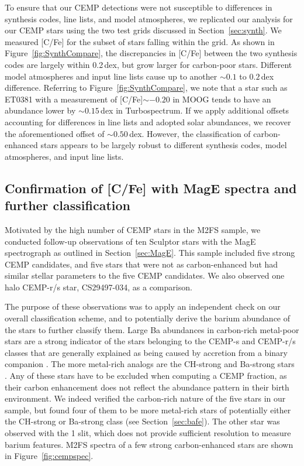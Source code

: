 \documentclass{emulateapj-rtx4}
\begin{document}
To ensure that our CEMP detections were not susceptible to differences in synthesis codes, line lists, and model
atmospheres, we replicated our analysis for our CEMP stars using the two test grids discussed in Section~\ref{sec:synth}. 
We measured [C/Fe] for the subset of stars falling within the grid. As shown in Figure~\ref{fig:SynthCompare}, the discrepancies in [C/Fe] between the two synthesis codes are largely within 0.2\,dex, but grow larger for carbon-poor stars. 
Different model atmospheres and input line lists cause up to another $\sim0.1$ to $0.2$\,dex difference.
Referring to Figure~\ref{fig:SynthCompare}, we note that a star such as ET0381 with a measurement of [C/Fe]$\sim-0.20$ in MOOG tends to have an abundance lower by $\sim0.15$\,dex in Turbospectrum. If we apply additional offsets accounting for differences in line lists and adopted solar abundances, we recover the aforementioned offset of $\sim0.50$\,dex.
However, the classification of carbon-enhanced stars appears to be largely robust to different synthesis codes, model atmospheres, and input line lists.

\subsection{Confirmation of [C/Fe] with MagE spectra and further classification}
\label{sec:conf}

Motivated by the high number of CEMP stars
in the M2FS sample, we conducted follow-up observations of ten Sculptor stars with the MagE spectrograph as outlined in Section~\ref{sec:MagE}. This sample
included five strong CEMP candidates, and five stars that were not as carbon-enhanced but had similar stellar parameters to the five CEMP candidates.
We also observed one halo CEMP-r/s star, CS29497-034, as a comparison. 

The purpose of these observations was to apply an independent check on our overall classification scheme,
and to potentially derive the barium abundance of the stars to further classify them.
Large Ba abundances in carbon-rich metal-poor stars are a strong indicator of the stars belonging to the CEMP-s and CEMP-r/s classes that 
are generally explained as being caused by accretion from a binary companion \citep{han+16b}. The more metal-rich analogs are 
the CH-strong and Ba-strong stars \citep{mw+90}. Any of these stars have to be excluded when computing a CEMP fraction, 
as their carbon enhancement does not reflect the abundance pattern in their birth environment. 
We indeed verified the carbon-rich nature of
the five stars in our sample, but found four of them to be more metal-rich stars of potentially 
either the CH-strong or Ba-strong class (see Section~\ref{sec:bafe}).
The other star was observed with the 1\arcsec\,\,slit, which does not provide sufficient resolution to measure barium features. 
M2FS spectra of a few strong carbon-enhanced stars are shown in Figure~\ref{fig:cempspec}.
\end{document}
